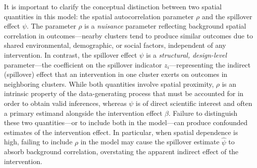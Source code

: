 \documentclass{article}[11pt]
\begin{document}
It is important to clarify the conceptual distinction between two spatial quantities in this model: the spatial autocorrelation parameter $\rho$ and the spillover effect $\psi$. The parameter $\rho$ is a \emph{nuisance} parameter reflecting background spatial correlation in outcomes---nearby clusters tend to produce similar outcomes due to shared environmental, demographic, or social factors, independent of any intervention. In contrast, the spillover effect $\psi$ is a \emph{structural, design-level} parameter---the coefficient on the spillover indicator $z_i$---representing the indirect (spillover) effect that an intervention in one cluster exerts on outcomes in neighboring clusters. While both quantities involve spatial proximity, $\rho$ is an intrinsic property of the data-generating process that must be accounted for in order to obtain valid inferences, whereas $\psi$ is of direct scientific interest and often a primary estimand alongside the intervention effect $\beta$. Failure to distinguish these two quantities---or to include both in the model---can produce confounded estimates of the intervention effect. In particular, when spatial dependence is high, failing to include $\rho$ in the model may cause the spillover estimate $\hat{\psi}$ to absorb background correlation, overstating the apparent indirect effect of the intervention.
\end{document}
